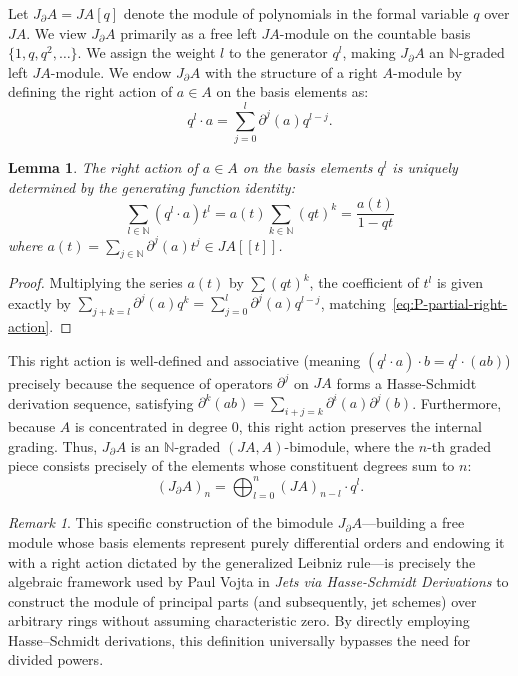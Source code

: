 \documentclass[a4paper, 12pt]{amsart}
\newtheorem{lemma}[theorem]{Lemma}
\theoremstyle{definition}
\theoremstyle{remark}
\newtheorem{remark}[theorem]{Remark}
\begin{document}
Let $J_\partial A = JA[q]$ denote the module of polynomials in the formal variable $q$ over $JA$. We view $J_\partial A$ primarily as a free left $JA$-module on the countable basis $\{1, q, q^2, \dots\}$. We assign the weight $l$ to the generator $q^l$, making $J_\partial A$ an $\mathbb{N}$-graded left $JA$-module.
We endow $J_\partial A$ with the structure of a right $A$-module by defining the right action of $a \in A$ on the basis elements as:
\begin{equation}
  \label{eq:P-partial-right-action}
  q^l \cdot a = \sum_{j=0}^l \partial^j(a) q^{l-j}.
\end{equation}
\begin{lemma}
  \label{lem:action-generating-function}
  The right action of $a \in A$ on the basis elements $q^l$ is uniquely determined by the generating function identity:
  \begin{equation}
    \label{eq:action-generating-function}
    \sum_{l \in \mathbb{N}} (q^l \cdot a) t^l = a(t) \sum_{k \in \mathbb{N}} (qt)^k = \frac{a(t)}{1 - qt}
  \end{equation}
  where $a(t) = \sum_{j \in \mathbb{N}} \partial^j(a) t^j \in JA[[t]]$.
\end{lemma}
\begin{proof}
  Multiplying the series $a(t)$ by $\sum (qt)^k$, the coefficient of $t^l$ is given exactly by $\sum_{j+k=l} \partial^j(a) q^k = \sum_{j=0}^l \partial^j(a) q^{l-j}$, matching~\eqref{eq:P-partial-right-action}.
\end{proof}
This right action is well-defined and associative (meaning $(q^l \cdot a) \cdot b = q^l \cdot (ab)$) precisely because the sequence of operators $\partial^j$ on $JA$ forms a Hasse-Schmidt derivation sequence, satisfying $\partial^k(ab) = \sum_{i+j=k} \partial^i(a)\partial^j(b)$. Furthermore, because $A$ is concentrated in degree $0$, this right action preserves the internal grading. Thus, $J_\partial A$ is an $\mathbb{N}$-graded $(JA, A)$-bimodule, where the $n$-th graded piece consists precisely of the elements whose constituent degrees sum to $n$:
\begin{equation}
  \label{eq:JdA-n}
  (J_\partial A)_n = \bigoplus_{l=0}^n (JA)_{n-l} \cdot q^l.
\end{equation}

\begin{remark}
  \label{rmk:vojta-construction}
  This specific construction of the bimodule $J_\partial A$---building a free module whose basis elements represent purely differential orders and endowing it with a right action dictated by the generalized Leibniz rule---is precisely the algebraic framework used by Paul Vojta in \emph{Jets via Hasse-Schmidt Derivations} to construct the module of principal parts (and subsequently, jet schemes) over arbitrary rings without assuming characteristic zero. By directly employing Hasse--Schmidt derivations, this definition universally bypasses the need for divided powers.
\end{remark}
\end{document}
